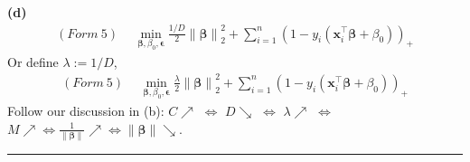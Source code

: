 \documentclass[11pt]{article}
\begin{document}
~\\
\textbf{(d)}
\begin{equation}
  \begin{split}
    (Form~5)~~ &\min\limits_{\bm{\beta}, \beta_0, \bm{\epsilon}} \frac{1/D}{2}\left\lVert \bm{\beta} \right\rVert_2^2 + \sum_{i=1}^n (1-y_i(\bm{x}_i^{\top} \bm{\beta} + \beta_0))_+
  \end{split}
\end{equation}
Or define $\lambda := 1/D$,
\begin{equation}
  \begin{split}
    (Form~5)~~ &\min\limits_{\bm{\beta}, \beta_0, \bm{\epsilon}} \frac{\lambda}{2}\left\lVert \bm{\beta} \right\rVert_2^2 + \sum_{i=1}^n (1-y_i(\bm{x}_i^{\top} \bm{\beta} + \beta_0))_+
  \end{split}
\end{equation}
Follow our discussion in (b): $C \nearrow$ $\iff$ $D\searrow$ $\iff$ $\lambda \nearrow$ $\iff$ $M\nearrow \iff \frac{1}{\left\lVert \bm{\beta} \right\rVert} \nearrow \iff \left\lVert \bm{\beta} \right\rVert \searrow$.
    
    
\noindent\rule{16cm}{0.4pt}
    
\end{document}
